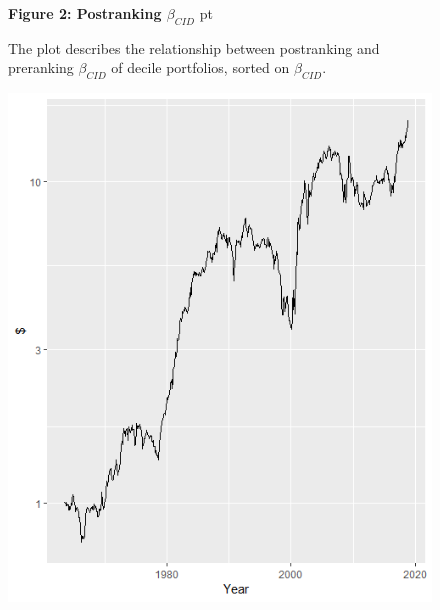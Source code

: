 \documentclass[16pt]{article}
\begin{document}
\begin{figure}
\textbf{Figure 2: Postranking $\beta_{CID}$}
 pt
\begin{flushleft}
{The plot describes the relationship between postranking and preranking $\beta_{CID}$ of decile portfolios, sorted on $\beta_{CID}$.}
\end{flushleft}
\centering
\includegraphics[width=1\textwidth]{Figure2.png}
\end{figure}
\end{document}
